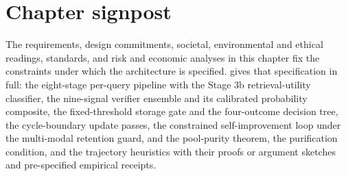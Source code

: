 \section{Chapter signpost}
\label{sec:ch3-signpost}

The requirements, design commitments, societal, environmental and ethical readings, standards, and risk and economic analyses in this chapter fix the constraints under which the architecture is specified.  gives that specification in full: the eight-stage per-query pipeline with the Stage 3b retrieval-utility classifier, the nine-signal verifier ensemble and its calibrated probability composite, the fixed-threshold storage gate and the four-outcome decision tree, the cycle-boundary update passes, the constrained self-improvement loop under the multi-modal retention guard, and the pool-purity theorem, the purification condition, and the trajectory heuristics with their proofs or argument sketches and pre-specified empirical receipts.
